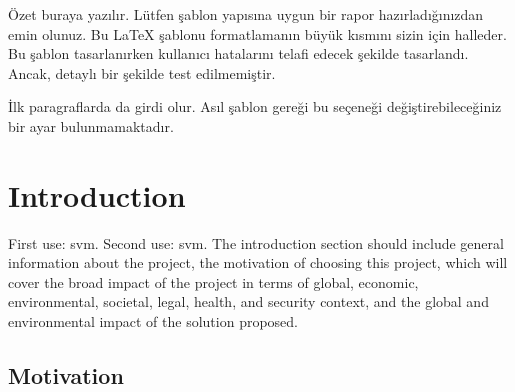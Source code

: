 \documentclass{mefsdp}
\begin{document}
	
	\makestandards
	
	\begin{abstract}
		Your abstract goes here. Make sure that you follow the guidelines. This \LaTeX{} template carries out much of the formatting for you. During the design of the template, it has been aimed to compensate for the user errors for formatting. However, it has not been tested rigorously. \newline \par
		
		First paragraphs also get indentation. You can't switch it off since the original template asserts.
	
	\end{abstract}
	
		
	\begin{abstractTR}
		Özet buraya yazılır. Lütfen şablon yapısına uygun bir rapor hazırladığınızdan emin olunuz. Bu \LaTeX{} şablonu formatlamanın büyük kısmını sizin için halleder. Bu şablon tasarlanırken kullanıcı hatalarını telafi edecek şekilde tasarlandı. Ancak, detaylı bir şekilde test edilmemiştir. \newline \par
		
		İlk paragraflarda da girdi olur. Asıl şablon gereği bu seçeneği değiştirebileceğiniz bir ayar bulunmamaktadır.
		
	\end{abstractTR}
	
	\makelists

	\section{Introduction}
	
	First use: \gls{svm}. Second use: \gls{svm}.
	The introduction section should include general information about the project, the motivation of choosing this project, which will cover the broad impact of the project in terms of global, economic, environmental, societal, legal, health, and security context, and the global and environmental impact of the solution proposed. 
	
	\subsection{Motivation}
	
\end{document}
